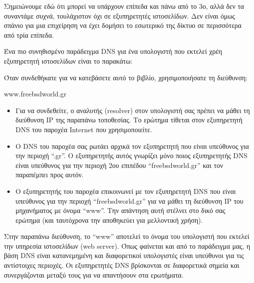 Σημειώνουμε εδώ ότι μπορεί να υπάρχουν επίπεδα και πάνω από το 3ο, αλλά δεν τα συναντάμε συχνά, τουλάχιστον όχι σε εξυπηρετητές ιστοσελίδων. Δεν είναι όμως σπάνιο για μια επιχείρηση να έχει δομήσει το εσωτερικό της δίκτυο σε περισσότερα από τρία επίπεδα.

Ένα πιο συνηθισμένο παράδειγμα DNS για ένα υπολογιστή που εκτελεί χρέη εξυπηρετητή ιστοσελίδων είναι το παρακάτω:

Όταν συνδεθήκατε για να κατεβάσετε αυτό το βιβλίο, χρησιμοποιήσατε τη διεύθυνση:

\begin{center}
www.freebsdworld.gr
\end{center}

\begin{itemize}
\item Για να συνδεθείτε, ο αναλυτής (resolver) στον υπολογιστή σας πρέπει να μάθει τη διεύθυνση IP της παραπάνω τοποθεσίας. Το ερώτημα τίθεται στον εξυπηρετητή DNS του παροχέα Internet που χρησιμοποιείτε.
\item Ο DNS του παροχέα σας ρωτάει αρχικά τον εξυπηρετητή που είναι υπεύθυνος για την περιοχή ``.gr''. Ο εξυπηρετητής αυτός γνωρίζει μόνο ποιος  εξυπηρετητής DNS είναι υπεύθυνος για την περιοχή 2ου επιπέδου ``freebsdworld.gr'' και τον παραπέμπει προς αυτόν.
\item Ο εξυπηρετητής του παροχέα επικοινωνεί με τον εξυπηρετητή DNS που είναι υπεύθυνος για την περιοχή ``freebsdworld.gr'' για να μάθει τη διεύθυνση IP του μηχανήματος με όνομα ``www''. Την απάντηση αυτή στέλνει στο δικό σας ερώτημα (και ταυτόχρονα την αποθηκεύει για μελλοντική χρήση).
\end{itemize}

Στην παραπάνω διεύθυνση, το ``www'' αποτελεί το όνομα του υπολογιστή που εκτελεί την υπηρεσία ιστοσελίδων (web server). Όπως φαίνεται και από το παράδειγμα μας, η βάση DNS είναι κατανεμημένη και διαφορετικοί υπολογιστές είναι υπεύθυνοι για τις αντίστοιχες περιοχές. Οι εξυπηρετητές DNS βρίσκονται σε διαφορετικά σημεία και συνεργάζονται μεταξύ τους για να απαντήσουν στα ερωτήματα.